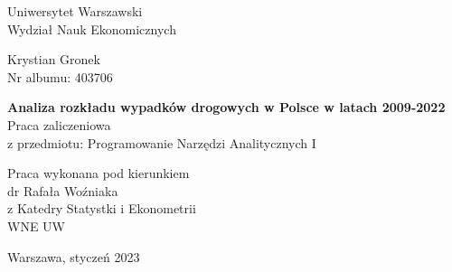 \begin{titlepage}
    \begin{center}
            
        {\Large
        Uniwersytet Warszawski\\
        Wydział Nauk Ekonomicznych}
        \vspace{3cm}
        
        Krystian Gronek\\
        Nr albumu: 403706
            
        \vspace{1cm}
           
        {\Large
        \textbf{Analiza rozkładu wypadków drogowych w Polsce w latach 2009-2022}} \\
        \vspace{1.5cm}
        Praca zaliczeniowa \\
        z przedmiotu: Programowanie Narzędzi Analitycznych I
    \end{center}
        \vspace{3cm}
    \begin{flushright}
        Praca wykonana pod kierunkiem\\
        dr Rafała Woźniaka\\
        z Katedry Statystki i Ekonometrii\\
        WNE UW
    \end{flushright}
        \vfill
    \begin{center}
        Warszawa, styczeń 2023
    \end{center}
\end{titlepage}
